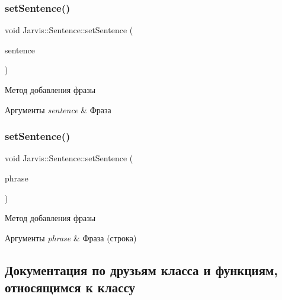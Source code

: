\subsubsection{\texorpdfstring{set\+Sentence()}{setSentence()}\hspace{0.1cm}{\footnotesize\ttfamily [1/2]}}
{\footnotesize\ttfamily void Jarvis\+::\+Sentence\+::set\+Sentence (\begin{DoxyParamCaption}\item[{const \hyperlink{classJarvis_1_1Sentence}{Sentence} \&}]{sentence }\end{DoxyParamCaption})}



Метод добавления фразы 


\begin{DoxyParams}{Аргументы}
{\em sentence} & Фраза \\
\hline
\end{DoxyParams}
\mbox{\label{classJarvis_1_1Sentence_ad026c842e31491b85f2f6f186667c799}} 
\subsubsection{\texorpdfstring{set\+Sentence()}{setSentence()}\hspace{0.1cm}{\footnotesize\ttfamily [2/2]}}
{\footnotesize\ttfamily void Jarvis\+::\+Sentence\+::set\+Sentence (\begin{DoxyParamCaption}\item[{const phrase \&}]{phrase }\end{DoxyParamCaption})}



Метод добавления фразы 


\begin{DoxyParams}{Аргументы}
{\em phrase} & Фраза (строка) \\
\hline
\end{DoxyParams}


\subsection{Документация по друзьям класса и функциям, относящимся к классу}
\mbox{\label{classJarvis_1_1Sentence_ab281eae311e630f9dca86a48fc608518}} 
